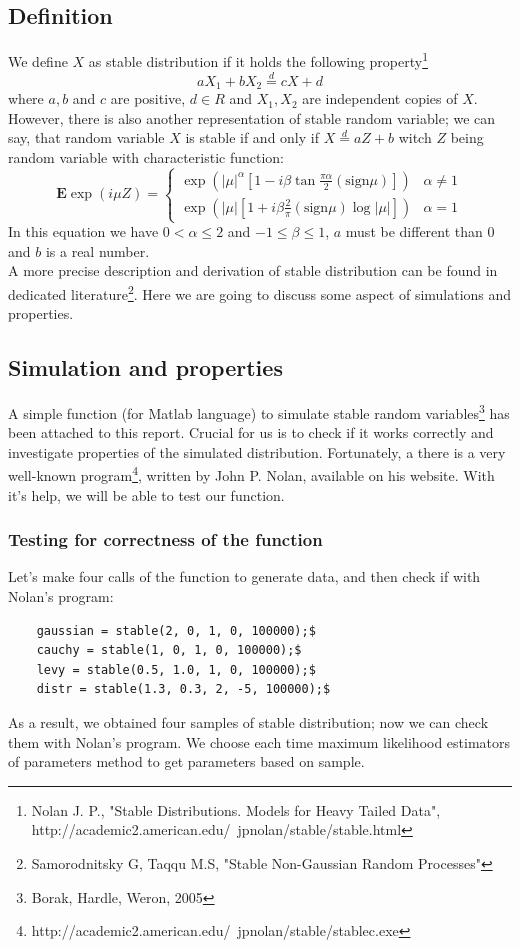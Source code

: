 \documentclass{article}
\begin{document}
	\subsection{Definition}
	We define $X$ as stable distribution if it holds the following property\footnote{Nolan J. P., "Stable Distributions. Models for Heavy Tailed Data", http://academic2.american.edu/~jpnolan/stable/stable.html}
	\begin{equation}
	aX_1+bX_2 \stackrel{d}{=} cX + d
	\end{equation}
	where $a, b$ and $c$ are positive, $d\in R$ and $X_1, X_2$ are independent copies of $X$.
	However, there is also another representation of stable random variable; we can say, that random variable $X$ is stable if and only if $X \stackrel{d}{=} aZ + b$ witch $Z$ being random variable with characteristic function:
	\begin{equation}
		\mathbf{E} \exp(i\mu Z) = \begin{cases}
		\exp(|\mu|^\alpha[1-i\beta \tan\frac{\pi \alpha}{2}(\mbox{sign}\mu)]) & \alpha \neq 1 \\
		\exp(|\mu|[1+i\beta \frac{2}{\pi} (\mbox{sign}\mu) \log |\mu|]) & \alpha = 1
		\end{cases}
	\end{equation}
In this equation we have $0<\alpha \leq 2$ and $-1 \leq \beta \leq 1$, $a$ must be different than $0$ and $b$ is a real number.\\
A more precise description and derivation of stable distribution can be found in dedicated literature\footnote{Samorodnitsky G, Taqqu M.S, "Stable Non-Gaussian Random Processes"}. Here we are going to discuss some aspect of simulations and properties.

	\subsection{Simulation and properties}
	A simple function (for Matlab language) to simulate stable random variables\footnote{Borak, Hardle, Weron, 2005} has been attached to this report. Crucial for us is to check if it works correctly and investigate properties of the simulated distribution. Fortunately, a there is a very well-known program\footnote{http://academic2.american.edu/~jpnolan/stable/stablec.exe}, written by John P. Nolan, available on his website. With it's help, we will be able to test our function.
	\subsubsection{Testing for correctness of the function}
	Let's make four calls of the function to generate data, and then check if with Nolan's program:
	\begin{lstlisting}
	gaussian = stable(2, 0, 1, 0, 100000);$
	cauchy = stable(1, 0, 1, 0, 100000);$
	levy = stable(0.5, 1.0, 1, 0, 100000);$
	distr = stable(1.3, 0.3, 2, -5, 100000);$
	\end{lstlisting}
	As a result, we obtained four samples of stable distribution; now we can check them with Nolan's program. We choose each time maximum likelihood estimators of parameters method to get parameters based on sample. \\
	
\end{document}
